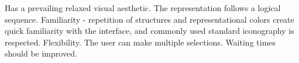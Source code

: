 \begin{itemize}
    \done Has a prevailing relaxed visual aesthetic.
   \done The representation follows a logical sequence.
    \done Familiarity - repetition of structures and representational colors create quick familiarity with the interface, and commonly used standard iconography is respected.
    \done Flexibility. The user can make multiple selections.
    \crossed Waiting times should be improved.
    
\end{itemize}
\newpage
